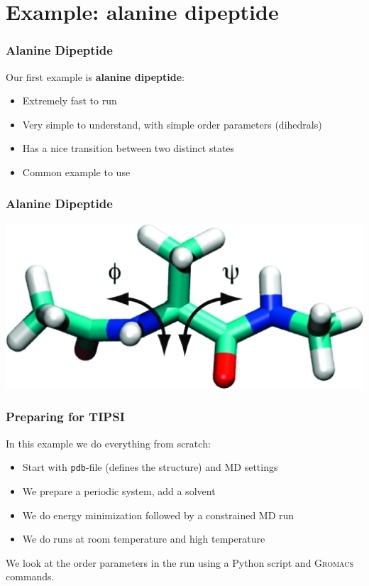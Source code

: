 \documentclass[hyperref={pdfpagelabels=false}]{beamer}
\begin{document}
\section{Example: alanine dipeptide} 
\setcounter{subsection}{1}

\begin{frame}
\frametitle{Alanine Dipeptide} 
Our first example is \textbf{alanine dipeptide}:
\begin{itemize}
\item Extremely fast to run
\item Very simple to understand, with simple order parameters (dihedrals)
\item Has a nice transition between two distinct states
\item Common example to use
\end{itemize}
\end{frame}

\begin{frame}
\frametitle{Alanine Dipeptide} 
\begin{center}
\includegraphics[scale=0.4]{images/alanine.png}
\end{center}
\end{frame}

\begin{frame}
\frametitle{Preparing for \textsc{TIPSI}} 
In this example we do everything from scratch:
\begin{itemize}
\item Start with \texttt{pdb}-file (defines the structure) and MD settings
\item We prepare a periodic system, add a solvent
\item We do energy minimization followed by a constrained MD run
\item We do runs at room temperature and high temperature
\end{itemize}
We look at the order parameters in the run using a Python script and \textsc{Gromacs} commands.
\end{frame}
\end{document}
